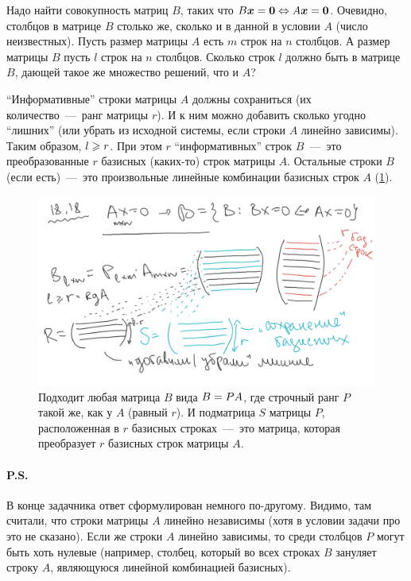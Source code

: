 \documentclass[a4paper,12pt]{article}
\begin{document}
  \begin{solution}
    Надо найти совокупность матриц $B$, таких что $B \bds x \hm= \bds 0 \hm\Leftrightarrow A \bds x \hm= \bds 0$.
    Очевидно, столбцов в матрице $B$ столько же, сколько и в данной в условии $A$ (число неизвестных).
    Пусть размер матрицы $A$ есть $m$ строк на $n$ столбцов.
    А размер матрицы $B$ пусть $l$ строк на $n$ столбцов.
    Сколько строк $l$ должно быть в матрице $B$, дающей такое же множество решений, что и $A$?
    
    ``Информативные'' строки матрицы $A$ должны сохраниться (их количество~---~ранг матрицы $r$).
    И к ним можно добавить сколько угодно ``лишних'' (или убрать из исходной системы, если строки $A$ линейно зависимы).
    Таким образом, $l \hm\geq r$.
    При этом $r$ ``информативных'' строк $B$~---~это преобразованные $r$ базисных (каких-то) строк матрицы $A$.
    Остальные строки $B$ (если есть)~---~это произвольные линейные комбинации базисных строк $A$ (\ref{fig:colourful-rows}).

    \begin{figure}[h]
      \centering
    
      \includegraphics[width=0.8\columnwidth]{18.18.png}
    
      \caption{Подходит любая матрица $B$ вида $B \hm= PA$, где строчный ранг $P$ такой же, как у $A$ (равный $r$).
      И подматрица $S$ матрицы $P$, расположенная в $r$ базисных строках~---~это матрица, которая преобразует $r$ базисных строк матрицы $A$.}
      \label{fig:colourful-rows}
    \end{figure}
    
    \paragraph{P.S.}
    В конце задачника ответ сформулирован немного по-другому.
    Видимо, там считали, что строки матрицы $A$ линейно независимы (хотя в условии задачи про это не сказано).
    Если же строки $A$ линейно зависимы, то среди столбцов $P$ могут быть хоть нулевые (например, столбец, который во всех строках $B$ зануляет строку $A$, являющуюся линейной комбинацией базисных).
  \end{solution}
\end{document}
